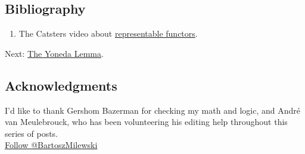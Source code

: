 \subsection{Bibliography}\label{bibliography}

\begin{enumerate}
\tightlist
\item
  The Catsters video about
  \href{https://www.youtube.com/watch?v=4QgjKUzyrhM}{representable
  functors}.
\end{enumerate}

Next:
\href{https://bartoszmilewski.com/2015/09/01/the-yoneda-lemma/}{The
Yoneda Lemma}.

\subsection{Acknowledgments}\label{acknowledgments}

I'd like to thank Gershom Bazerman for checking my math and logic, and
André van Meulebrouck, who has been volunteering his editing help
throughout this series of posts.\\
\href{https://twitter.com/BartoszMilewski}{Follow @BartoszMilewski}
